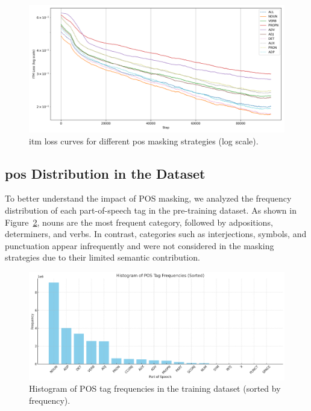 \begin{figure}[h]
    \caption{\acrshort{itm} loss curves for different \acrshort{pos} masking strategies (log scale).}
    \label{fig:itm_loss_pretrain}
    \begin{center}
        \includegraphics[width=1\textwidth]{Images/graph/itm.png}
    \end{center}
\end{figure}

\subsection{\acrshort{pos} Distribution in the Dataset}
To better understand the impact of POS masking, we analyzed the frequency distribution of each part-of-speech tag in the pre-training dataset.
As shown in Figure~\ref{fig:pos_count}, nouns are the most frequent category, followed by adpositions, determiners, and verbs.
In contrast, categories such as interjections, symbols, and punctuation appear infrequently and were not considered in the masking strategies due to their limited semantic contribution.

\begin{figure}[h]
    \caption{Histogram of POS tag frequencies in the training dataset (sorted by frequency).}
    \label{fig:pos_count}
    \begin{center}
        \includegraphics[width=1\textwidth]{Images/graph/pos_count.png}
    \end{center}
\end{figure}

